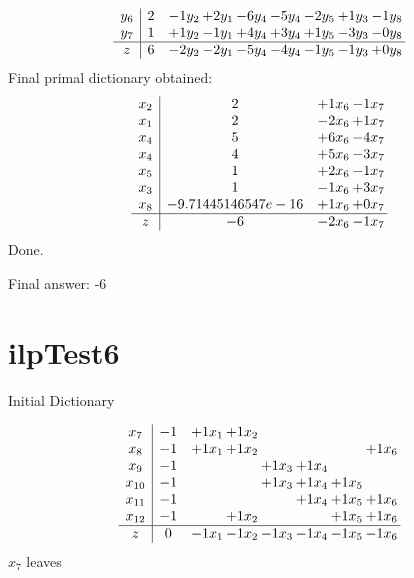 \documentclass[11pt]{article}
\begin{document}
\[\begin{array}{c| c c@{\hskip 2pt} c@{\hskip 2pt} c@{\hskip 2pt} c@{\hskip 2pt} c@{\hskip 2pt} c@{\hskip 2pt} c@{\hskip 2pt} }
 y_{6}   &  2 & -1 y_{2} & + 2 y_{1} & -6 y_{4} & -5 y_{4} & -2 y_{5} & + 1 y_{3} & -1 y_{8}\\
 y_{7}   &  1 & + 1 y_{2} & -1 y_{1} & + 4 y_{4} & + 3 y_{4} & + 1 y_{5} & -3 y_{3} & -0 y_{8}\\
\hline
z    &  6 & -2 y_{2} & -2 y_{1} & -5 y_{4} & -4 y_{4} & -1 y_{5} & -1 y_{3} & + 0 y_{8}\\
\end{array}\]
 Final primal dictionary obtained: 
\[\begin{array}{c| c c@{\hskip 2pt} c@{\hskip 2pt} }
 x_{2}   &  2 & + 1 x_{6} & -1 x_{7}\\
 x_{1}   &  2 & -2 x_{6} & + 1 x_{7}\\
 x_{4}   &  5 & + 6 x_{6} & -4 x_{7}\\
 x_{4}   &  4 & + 5 x_{6} & -3 x_{7}\\
 x_{5}   &  1 & + 2 x_{6} & -1 x_{7}\\
 x_{3}   &  1 & -1 x_{6} & + 3 x_{7}\\
 x_{8}   &  -9.71445146547e-16 & + 1 x_{6} & + 0 x_{7}\\
\hline
z    &  -6 & -2 x_{6} & -1 x_{7}\\
\end{array}\]
Done.

Final answer: -6

\section{ilpTest6}

Initial Dictionary 

\[\begin{array}{c| c c@{\hskip 2pt} c@{\hskip 2pt} c@{\hskip 2pt} c@{\hskip 2pt} c@{\hskip 2pt} c@{\hskip 2pt} }
 x_{7}   &  -1 & + 1 x_{1} & + 1 x_{2} &    &    &    &   \\
 x_{8}   &  -1 & + 1 x_{1} & + 1 x_{2} &    &    &   & + 1 x_{6}\\
 x_{9}   &  -1  &    &   & + 1 x_{3} & + 1 x_{4} &    &   \\
 x_{10}   &  -1  &    &   & + 1 x_{3} & + 1 x_{4} & + 1 x_{5} &   \\
 x_{11}   &  -1  &    &    &   & + 1 x_{4} & + 1 x_{5} & + 1 x_{6}\\
 x_{12}   &  -1  &   & + 1 x_{2} &    &   & + 1 x_{5} & + 1 x_{6}\\
\hline
z    &  0 & -1 x_{1} & -1 x_{2} & -1 x_{3} & -1 x_{4} & -1 x_{5} & -1 x_{6}\\
\end{array}\]
$ x_{7} $ leaves 
\end{document}
